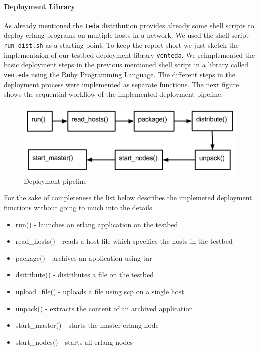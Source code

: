 \documentclass[10pt,a4wide]{article}
\begin{document}
\paragraph{Deployment Library}
As already mentioned the \texttt{teda} distribution provides already some shell scripts to deploy erlang programs on multiple hosts in a network. We used the shell script \texttt{run\_dist.sh} as a starting point. To keep the report short we just sketch the implementaion of our testbed deployment library \texttt{venteda}.
We reimplemented the basic deployment steps in the previous mentioned shell script in a library called \texttt{venteda} using the Ruby Programming Language. The different steps in the deployment process were implemented as separate functions.
The next figure shows the sequential workflow of the implemented deployment pipeline.
\begin{figure}[!htb]
\centering
\includegraphics[scale=0.5]{png/deployment_process.png}
\caption{Deployment pipeline} 
\end{figure}


For the sake of completeness the list below describes the implemeted deployment functions without going to much into the details.
\begin{itemize}
\itemsep0em
\item run() - launches an erlang application on the testbed 
\item read\_hosts() - reads a host file which specifies the hosts in the testbed
\item package() - archives an application using tar
\item dsitribute() -  distributes a file on the testbed
\item upload\_file() - uploads a file using scp on a single host
\item unpack() - extracts the content of an archived application
\item start\_master() - starts the master erlang node
\item start\_nodes() - starts all erlang nodes

\end{itemize}
\end{document}
